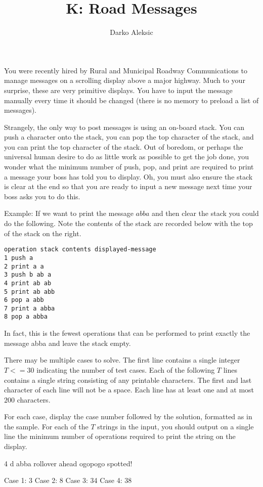 \documentclass{article}
\title{K: Road Messages}
\author{Darko Aleksic}
\begin{document}
\begin{problemDescription}
You were recently hired by Rural and Municipal Roadway Communications to manage 
messages on a scrolling display above a major highway. Much to your surprise, 
these are very primitive displays. You have to input the message manually every 
time it should be changed (there is no memory to preload a list of messages).

Strangely, the only way to post messages is using an on-board stack. You can 
push a character onto the stack, you can pop the top character of the stack, 
and you can print the top character of the stack.  Out of boredom, or perhaps 
the universal human desire to do as little work as possible to get the job done,
you wonder what the minimum number of push, pop, and print are required to print 
a message your boss has told you to display. Oh, you must also ensure the stack 
is clear at the end so that you are ready to input a new message next time your 
boss asks you to do this.

Example: If we want to print the message $abba$ and then clear the stack you 
could do the following. Note the contents of the stack are recorded below with 
the top of the stack on the right.

\begin{verbatim}
operation stack contents displayed-message
1 push a  
2 print a a
3 push b ab a
4 print ab ab
5 print ab abb
6 pop a abb
7 print a abba
8 pop a abba
\end{verbatim}

In fact, this is the fewest operations that can be performed to print exactly 
the message abba and leave the stack empty.

\end{problemDescription}

\begin{inputDescription}
There may be multiple cases to solve.  The first line contains a single 
integer $T <= 30$ indicating the number of test cases. Each of the following
$T$ lines contains a single string consisting of any printable characters. 
The first and last character of each line will not be a space. Each line has 
at least one and at most $200$ characters.
\end{inputDescription}

\begin{outputDescription}
For each case, display the case number followed by the solution, formatted as in 
the sample.  For each of the $T$ strings in the input, you should output on a 
single line the minimum number of operations required to print the string on the display.
\end{outputDescription}

\begin{sampleInput}
4
d
abba
rollover ahead
ogopogo spotted!
\end{sampleInput}
\begin{sampleOutput}
Case 1: 3
Case 2: 8
Case 3: 34
Case 4: 38
\end{sampleOutput}
\end{document}
